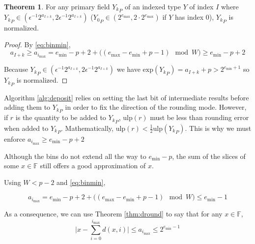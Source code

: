 \documentclass[12pt]{article}
\providecommand{\F}{\ensuremath{\mathbb{F}}}
\providecommand{\exp}{\ensuremath{\text{exp}}}
\providecommand{\min}{\ensuremath{\text{min}}}
\providecommand{\max}{\ensuremath{\text{max}}}
\providecommand{\ulp}{\ensuremath{\text{ulp}}}
\theoremstyle{definition}
\newtheorem{thm}{Theorem}[section]
\numberwithin{equation}{section}
\numberwithin{figure}{section}
\begin{document}
      \begin{samepage}
      \begin{thm}
        For any primary field ${Y_k}_P$ of an indexed type $Y$ of index $I$ where ${Y_k}_P \in (\epsilon^{-1} 2^{a_{I + k}}, 2 \epsilon^{-1} 2^{a_{I + k}})$ (${Y_0}_P \in (2^{e_{\max}}, 2 \cdot 2^{e_{\max}})$ if $Y$ has index 0), ${Y_k}_P$ is normalized.
        \label{thm:underflowufp}
      \end{thm}
      \end{samepage}

      \begin{proof}
        By \eqref{eq:binmin},
        \begin{equation*}
        a_{I + k} \geq a_{i_{\max}} = e_{\min} - p + 2 + \bigl((e_{\max} - e_{\min} + p - 1) \mod W\bigr) \geq e_{\min} - p + 2
        \end{equation*}

        Because ${Y_k}_P \in (\epsilon^{-1} 2^{a_{I + k}}, 2 \epsilon^{-1} 2^{a_{I + k}})$ we have $\exp({Y_k}_P) = a_{I + k} + p > 2^{e_{\min} + 1}$ so ${Y_k}_P$ is normalized.
      \end{proof}

      Algorithm \ref{alg:deposit} relies on setting the last bit of intermediate results before adding them to ${Y_k}_P$ in order to fix the direction of the rounding mode. However, if $r$ is the quantity to be added to ${Y_k}_P$, $\ulp(r)$ must be less than rounding error when added to ${Y_k}_P$. Mathematically, $\ulp(r) < \frac{1}{2}\ulp({Y_k}_P)$. This is why we must enforce $a_{i_{\max}} \geq e_{\min} - p + 2$

      Although the bins do not extend all the way to $e_{\min} - p$, the sum of the slices of some $x \in \F$ still offers a good approximation of $x$.

      Using $W < p - 2$ and \eqref{eq:binmin},

      \begin{equation*}
        a_{i_{\max}} = e_{\min} - p + 2 + \bigl((e_{\max} - e_{\min} + p - 1 ) \mod W\bigr) \leq {e_{\min} - 1}
      \end{equation*}

      As a consequence, we can use Theorem \ref{thm:dround} to say that for any $x \in \F$,
      \begin{equation}
        \bigl|x - \sum\limits_{i = 0}^{i_{\max}} d(x, i)\bigr| \leq a_{i_{\max}} \leq 2^{e_{\min} - 1}
        \label{eq:droundunderflow}
      \end{equation}
\end{document}
